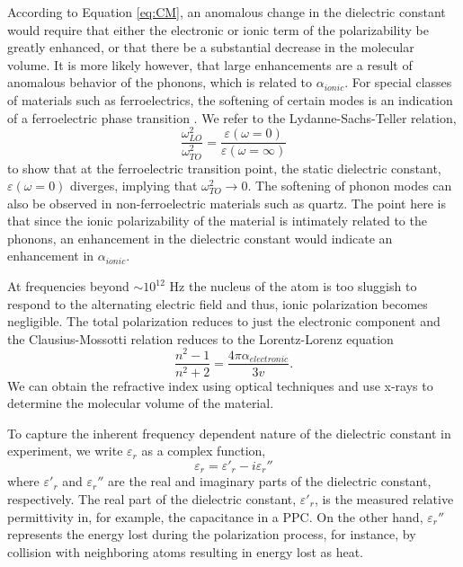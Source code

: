 According to Equation \ref{eq:CM}, an anomalous change in the dielectric constant would require that either the electronic or ionic term of the polarizability be greatly enhanced, or that there be a substantial decrease in the molecular volume. It is more likely however, that large enhancements are a result of anomalous behavior of the phonons, which is related to $\alpha_{ionic}$. For special classes of materials such as ferroelectrics, the softening of certain modes is an indication of a ferroelectric phase transition \cite{Nuzhnyy2009}. We refer to the Lydanne-Sachs-Teller relation,
\begin{equation}
\frac{\omega_{LO}^{2}}{\omega_{TO}^{2}} = \frac{\varepsilon(\omega = 0)}{\varepsilon(\omega = \infty)}
\end{equation}
to show that at the ferroelectric transition point, the static dielectric constant, $\varepsilon (\omega = 0)$ diverges, implying that  $\omega^{2}_{TO} \rightarrow 0$. The softening of phonon modes can also be observed in non-ferroelectric materials such as quartz. The point here is that since the ionic polarizability of the material is intimately related to the phonons, an enhancement in the dielectric constant would indicate an enhancement in $\alpha_{ionic}$.

At frequencies beyond $\sim10^{12}$ Hz the nucleus of the atom is too sluggish to respond to the alternating electric field and thus, ionic polarization becomes negligible. The total polarization reduces to just the electronic component and the Clausius-Mossotti relation reduces to the Lorentz-Lorenz equation
\begin{equation}\label{eq:LL}
\frac{n^{2}-1}{n^{2}+2} = \frac{4\pi\alpha_{electronic}}{3v}.
\end{equation}
We can obtain the refractive index using optical techniques and use x-rays to determine the molecular volume of the material.

To capture the inherent frequency dependent nature of the dielectric constant in experiment, we write $\varepsilon_{r}$ as a complex function,
\begin{equation}\label{eq:diecomp1}
\varepsilon_{r} = \varepsilon '_{r} - i \varepsilon_{r}''
\end{equation}
where $\varepsilon '_{r}$ and $\varepsilon_{r}''$ are the real and imaginary parts of the dielectric constant, respectively. The real part of the dielectric constant, $\varepsilon '_{r}$, is the measured relative permittivity in, for example, the capacitance in a PPC. On the other hand, $\varepsilon_{r}''$ represents the energy lost during the polarization process, for instance, by collision with neighboring atoms resulting in energy lost as heat.

